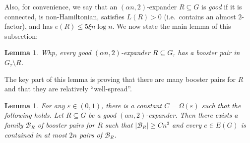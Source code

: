 \documentclass[reqno,final,a4paper]{amsart}
\numberwithin{equation}{section}
\newtheorem{lemma}[theorem]{Lemma}
\theoremstyle{definition}
\theoremstyle{remark}
\newcommand{\eps}{\varepsilon}
\def\calB{\mathcal{B}}
\begin{document}
Also, for convenience, we say that an $(\alpha n,2)$-expander $R\subseteq G$ is \emph{good} if it is connected, is non-Hamiltonian, satisfies $L(R)>0$ (i.e.\ contains an almost $2$-factor), and has $e(R)\leq 5\xi n\log n$.
We now state the main lemma of this subsection:
\begin{lemma}\label{lem:existence-booster-pair}
    Whp, every good $(\alpha n,2)$-expander $R\subseteq G_\tau$ has a booster pair in $G_\tau\setminus R$.
\end{lemma}
The key part of this lemma is proving that there are many booster pairs for $R$ and that they are relatively ``well-spread''.
\begin{lemma}\label{lem:many-boosters}
    For any $\eps\in (0,1)$, there is a constant $C=\Omega(\eps)$ such that the following holds. 
    Let $R\subseteq G$ be a good $(\alpha n,2)$-expander. Then there exists a family $\calB_R$ of booster pairs for $R$ such that $|\calB_R|\geq Cn^3$ and every $e\in E(G)$ is contained in at most $2n$ pairs of $\calB_R$.
\end{lemma}
\end{document}
